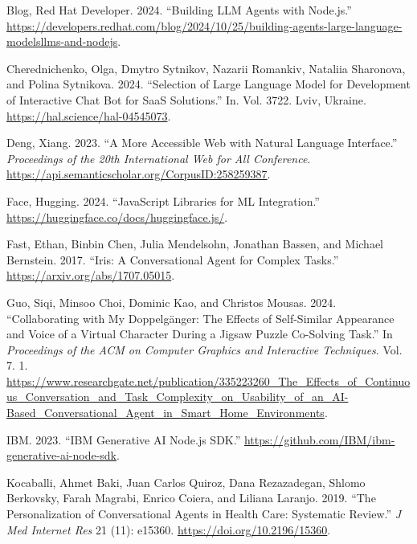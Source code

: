 \documentclass[
]{article}
\newlength{\cslhangindent}
\newenvironment{CSLReferences}[2] %
 {\begin{list}{}{%
  \setlength{\itemindent}{0pt}
  \setlength{\leftmargin}{0pt}
  \setlength{\parsep}{0pt}
  \ifodd #1
   \setlength{\leftmargin}{\cslhangindent}
   \setlength{\itemindent}{-1\cslhangindent}
  \fi
  \setlength{\itemsep}{#2\baselineskip}}}
 {\end{list}}
\begin{document}
\label{refs}
\begin{CSLReferences}{1}{0}
Blog, Red Hat Developer. 2024. {``Building LLM Agents with Node.js.''}
\url{https://developers.redhat.com/blog/2024/10/25/building-agents-large-language-modelsllms-and-nodejs}.

Cherednichenko, Olga, Dmytro Sytnikov, Nazarii Romankiv, Nataliia
Sharonova, and Polina Sytnikova. 2024. {``Selection of Large Language
Model for Development of Interactive Chat Bot for SaaS Solutions.''} In.
Vol. 3722. Lviv, Ukraine. \url{https://hal.science/hal-04545073}.

Deng, Xiang. 2023. {``A More Accessible Web with Natural Language
Interface.''} \emph{Proceedings of the 20th International Web for All
Conference}. \url{https://api.semanticscholar.org/CorpusID:258259387}.

Face, Hugging. 2024. {``JavaScript Libraries for ML Integration.''}
\url{https://huggingface.co/docs/huggingface.js/}.

Fast, Ethan, Binbin Chen, Julia Mendelsohn, Jonathan Bassen, and Michael
Bernstein. 2017. {``Iris: A Conversational Agent for Complex Tasks.''}
\url{https://arxiv.org/abs/1707.05015}.

Guo, Siqi, Minsoo Choi, Dominic Kao, and Christos Mousas. 2024.
{``Collaborating with My Doppelgänger: The Effects of Self-Similar
Appearance and Voice of a Virtual Character During a Jigsaw Puzzle
Co-Solving Task.''} In \emph{Proceedings of the ACM on Computer Graphics
and Interactive Techniques}. Vol. 7. 1.
\url{https://www.researchgate.net/publication/335223260_The_Effects_of_Continuous_Conversation_and_Task_Complexity_on_Usability_of_an_AI-Based_Conversational_Agent_in_Smart_Home_Environments}.

IBM. 2023. {``IBM Generative AI Node.js SDK.''}
\url{https://github.com/IBM/ibm-generative-ai-node-sdk}.

Kocaballi, Ahmet Baki, Juan Carlos Quiroz, Dana Rezazadegan, Shlomo
Berkovsky, Farah Magrabi, Enrico Coiera, and Liliana Laranjo. 2019.
{``The Personalization of Conversational Agents in Health Care:
Systematic Review.''} \emph{J Med Internet Res} 21 (11): e15360.
\url{https://doi.org/10.2196/15360}.


\end{CSLReferences}
\end{document}
